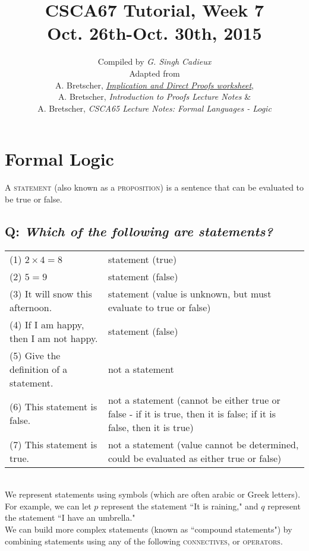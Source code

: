 \documentclass{article}
\title{\sc\LARGE CSCA67 Tutorial, Week 7\\
{\Large Oct. 26th-Oct. 30th, 2015}}
\date{}
\author{\sc Compiled by {\em G. Singh Cadieux}\\[1ex]
\sc Adapted from\\
A. Bretscher, \href{http://www.utsc.utoronto.ca/~bretscher/a67/lectures/implication.pdf}{\em Implication and Direct Proofs worksheet},\\
A. Bretscher, {\em Introduction to Proofs Lecture Notes} \&\\
A. Bretscher, {\em CSCA65 Lecture Notes: Formal Languages - Logic}}
\begin{document}
\maketitle

\section{\sc Formal Logic}

A \textsc{statement} (also known as a \textsc{proposition}) is a sentence that can be evaluated to be true or false.

\subsection*{Q: {\em Which of the following are statements?}}
\begin{tabular}{p{}|p{}}
(1) $2\times 4=8$&statement (true)\\\noalign{\smallskip}
(2) $5=9$&statement (false)\\\noalign{\smallskip}
(3) It will snow this afternoon.& statement (value is unknown, but must evaluate to true or false)
\\\noalign{\smallskip}
(4) If I am happy, then I am not happy.& statement (false)\\\noalign{\smallskip}
(5) Give the definition of a statement.& not a statement\\\noalign{\smallskip}
(6) This statement is false.& not a statement (cannot be either true or false - if it is true, then it is false; if it is false, then it is true)\\\noalign{\smallskip}
(7) This statement is true.& not a statement (value cannot be determined, could be evaluated as either true or false)
\end{tabular}\\[1em]
We represent statements using symbols (which are often arabic or Greek letters).\\
For example, we can let $p$ represent the statement ``It is raining," and $q$ represent the statement ``I have an umbrella."\\[1em]
We can build more complex statements (known as ``compound statements") by combining statements using any of the following \textsc{connectives}, or \textsc{operators}.\\[1ex]
\end{document}
